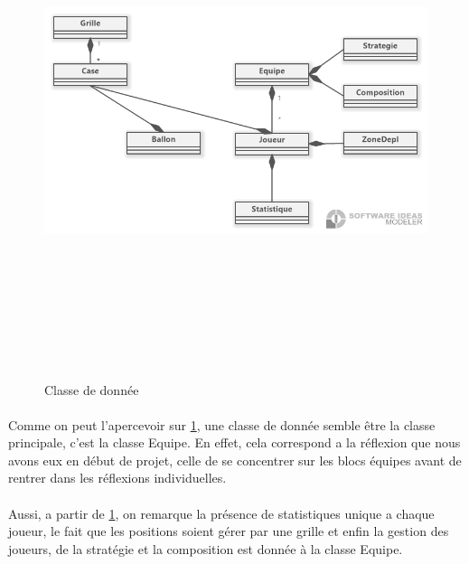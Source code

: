 \begin{figure}[h]
\centering
\includegraphics[width=17cm,height=15cm]{images/Classdiagram.png}
\caption{Classe de donnée}
\label{fig:classDonnee}
\end{figure}

\paragraph{}
    Comme on peut l'apercevoir sur \ref{fig:classDonnee}, une classe de donnée semble être la classe principale, c'est la classe Equipe. En effet, cela correspond a la réflexion que nous avons eux en début de projet, celle de se concentrer sur les blocs équipes avant de rentrer dans les réflexions individuelles.
\paragraph{}
    Aussi, a partir de \ref{fig:classDonnee}, on remarque la présence de statistiques unique a chaque joueur, le fait que les positions soient gérer par une grille et enfin la gestion des joueurs, de la stratégie et la composition est donnée à la classe Equipe.
    

